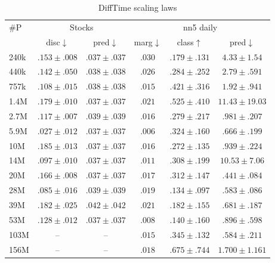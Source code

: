 \documentclass{article}
\begin{document}
\begin{table}[!ht]
    \centering
    \caption{DiffTime scaling laws}
    \label{tab:difftime_scaling_laws}
    \begin{tabular}{l|cc|ccc}
        \toprule
        $\#$P & \multicolumn{2}{c|}{Stocks} & \multicolumn{3}{c|}{nn5 daily} \\ 
        & disc$\downarrow$ & pred$\downarrow$ & marg$\downarrow$ & class$\uparrow$ & pred$\downarrow$ \\
        \midrule
        240k & $.153 \pm .008$ & $.037 \pm .037$ & $.030$ & $.179 \pm .131$ & $4.33 \pm 1.54$ \\ 
        440k & $.142 \pm .050$ & $.038 \pm .038$ & $.026$ & $.284 \pm .252$ & $2.79 \pm .591$ \\
        757k & $.108 \pm .015$ & $.038 \pm .038$ & $.015$ & $.421 \pm .316$ & $1.92 \pm .941$ \\
        1.4M & $.179 \pm .010$ & $.037 \pm .037$ & $.021$ & $.525 \pm .410$ & $11.43 \pm 19.03$\\
        2.7M & $.117 \pm .007$ & $.039 \pm .039$ & $.016$ & $.279 \pm .217$ & $.981 \pm .207$ \\
        5.9M & $.027 \pm .012$ & $.037 \pm .037$ & $.006$ & $.324 \pm .160$ & $.666 \pm .199$ \\
        10M & $.185 \pm .013$ & $.037 \pm .037$ & $.016$ & $.272 \pm .135$ & $.939 \pm .224$ \\
        14M & $.097 \pm .010$ & $.037 \pm .037$ & $.011$ & $.308 \pm .199$ & $10.53 \pm 7.06$ \\
        20M & $.166 \pm .008$ & $.037 \pm .037$ & $.017$ & $.312 \pm .147$ & $.441 \pm .084$ \\
        28M & $.085 \pm .016$ & $.039 \pm .039$ & $.019$ & $.134 \pm .097$ & $.583 \pm .086$ \\
        39M & $.182 \pm .025$ & $.042 \pm .042$ & $.021$ & $.182 \pm .155$ & $.681 \pm .187$ \\
        53M & $.128 \pm .012$ & $.037 \pm .037$ & $.008$ & $.140 \pm .160$ & $.896 \pm .598$ \\
        103M & -- & -- & $.015$ & $.345 \pm .132$ & $.584 \pm .211$ \\
        156M & -- & -- & $.018$ & $.675 \pm .744$ & $1.700 \pm 1.161$ \\
        \bottomrule
    \end{tabular}
\end{table}


\clearpage
\end{document}
